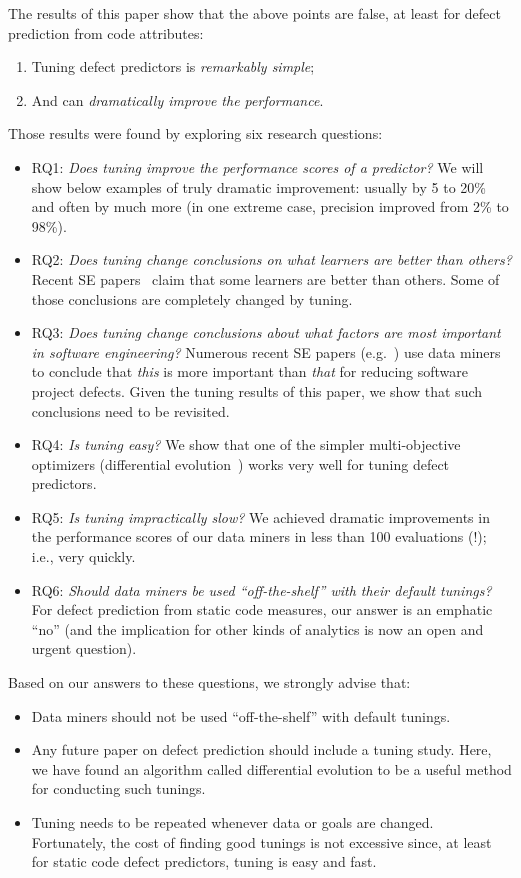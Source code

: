\documentclass{sig-alternative}
\newcommand{\bi}{\begin{itemize}[leftmargin=0.4cm]}
\newcommand{\ei}{\end{itemize}}
\newcommand{\be}{\begin{enumerate}}
\newcommand{\ee}{\end{enumerate}}
\begin{document}
The results of this paper show that the above points are
false,  at least for
defect prediction from  code attributes:
\be
\item
Tuning  defect predictors is {\em remarkably simple};
\item
And can {\em dramatically improve the performance}. 
\ee
Those results were found by   exploring six research questions:
\bi
\item RQ1: {\em Does   tuning    improve the performance scores of a predictor?} We will show below
 examples of truly dramatic improvement:
 usually by 5 to 20\% and often by much more (in one extreme case, precision improved from 2\% to 98\%).
\item RQ2: {\em Does tuning change conclusions on what learners are better than others?} 
Recent SE papers~\cite{lessmann2008benchmarking,hall11} claim that some learners are better than others. 
Some of those conclusions are completely changed by tuning. 
\item RQ3: {\em Does tuning change conclusions about what factors are most important in software engineering?} Numerous recent SE papers (e.g.~\cite{bell2013limited,rahman2013how,me02k,Moser:2008,zimmermann2007predicting,%
herzig2013predicting}) use data miners to conclude that {\em this}
is more important than {\em that} for reducing software project defects.
Given the  tuning results of this paper, we show that such conclusions need to be revisited.
\item  RQ4: {\em Is tuning easy?} We show that one of the simpler multi-objective optimizers
(differential evolution~\cite{storn1997differential}) works very well for tuning defect predictors. 
\item RQ5: {\em Is tuning impractically slow?} We achieved dramatic improvements in the performance scores
of our data miners in less than 100 evaluations (!); i.e., very
quickly.
\item RQ6: {\em Should data miners be used ``off-the-shelf'' with their default tunings?} 
For defect prediction from static code measures, our answer is an emphatic ``no'' (and
the implication for other kinds of  analytics is now an open and urgent question).
\ei
Based on our answers to these  questions,  we strongly advise that:
\bi
\item
Data miners should not be used ``off-the-shelf'' with default tunings.
\item
Any future paper on defect prediction should include a 
tuning study. Here, we have found  an algorithm called differential
evolution to be a useful method for conducting such
tunings.
\item
Tuning needs to be repeated
whenever data or goals are changed.
Fortunately, the cost of finding good tunings is not excessive since, at least for
static code defect predictors, tuning is easy and fast.
\ei
\end{document}
